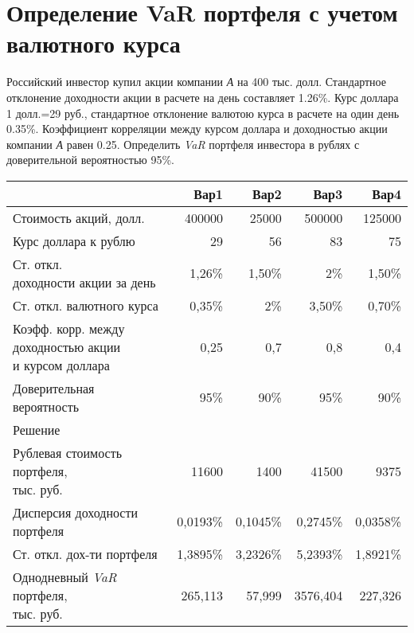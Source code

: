 \documentclass[12pt,a4paper]{article}
\begin{document}
\section{Определение VaR портфеля с учетом валютного курса}
\begin{taskrus}
Российский инвестор купил акции компании \textit{А} на 400 тыс. долл. Стандартное отклонение доходности акции в расчете на день составляет 1.26\%. Курс доллара 1 долл.=29 руб., стандартное отклонение валютою курса в расчете на один день 0.35\%. Коэффициент корреляции между курсом доллара и доходностью акции компании \textit{А} равен 0.25. Определить \textit{VaR }портфеля инвестора в рублях с доверительной вероятностью 95\%.

\begin{table}[H]
  \centering
    \begin{tabular}{lrrrr}
    \toprule
          & Вар1  & Вар2  & Вар3  & Вар4 \\
    \midrule
    Стоимость акций, долл. & 400000 & 25000 & 500000 & 125000 \\
    Курс доллара к рублю & 29    & 56    & 83    & 75 \\
    \specialcell{Ст. откл.\\
    доходности акции за день }& 1,26\% & 1,50\% & 2\%   & 1,50\% \\
    Ст. откл. валютного курса & 0,35\% & 2\%   & 3,50\% & 0,70\% \\
    \specialcell{Коэфф. корр. между\\
    доходностью акции\\и курсом доллара} & 0,25  & 0,7   & 0,8   & 0,4 \\
    Доверительная вероятность & 95\%  & 90\%  & 95\%  & 90\% \\
    Решение &       &       &       &  \\
    \specialcell{Рублевая стоимость портфеля,\\тыс. руб.} & 11600 & 1400  & 41500 & 9375 \\
    Дисперсия доходности портфеля & 0,0193\% & 0,1045\% & 0,2745\% & 0,0358\% \\
    Ст. откл. дох-ти портфеля & 1,3895\% & 3,2326\% & 5,2393\% & 1,8921\% \\
    \specialcell{Однодневный \textit{VaR }портфеля,\\тыс. руб.} & 265,113 & 57,999 & 3576,404 & 227,326 \\
    \bottomrule
    \end{tabular}%
  \label{tab:addlabel}%
\end{table}%
\end{taskrus}
\pagebreak
\end{document}
